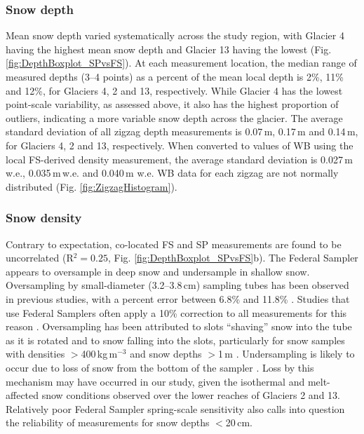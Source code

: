 \documentclass[review,oneside, letterpaper]{igs} %
\begin{document}
\subsubsection{Snow depth}
Mean snow depth varied systematically across the study region, with Glacier 4 having the highest mean snow depth and Glacier 13 having the lowest (Fig. \ref{fig:DepthBoxplot_SPvsFS}). At each measurement location, the median range of measured depths (3--4 points) as a percent of the mean local depth is 2\%, 11\% and 12\%, for Glaciers 4, 2 and 13, respectively. While Glacier 4 has the lowest point-scale variability, as assessed above, it also has the highest proportion of outliers, indicating a more variable snow depth across the glacier. The average standard deviation of all zigzag depth measurements is 0.07\,m, 0.17\,m and 0.14\,m, for Glaciers 4, 2 and 13, respectively. When converted to values of WB using the local FS-derived density measurement, the average standard deviation is 0.027\,m\,w.e., 0.035\,m\,w.e. and 0.040\,m w.e. WB data for each zigzag are not normally distributed (Fig. \ref{fig:ZigzagHistogram}).

\subsubsection{Snow density}

Contrary to expectation, co-located FS and SP measurements are found to be uncorrelated (R$^2=0.25$, Fig. \ref{fig:DepthBoxplot_SPvsFS}b). The Federal Sampler appears to oversample in deep snow and undersample in shallow snow. Oversampling by small-diameter (3.2--3.8\,cm) sampling tubes has been observed in previous studies, with a percent error between 6.8\% and 11.8\% \citep[e.g.][]{Work1965, Fames1982, Conger2009}. Studies that use Federal Samplers often apply a 10\% correction to all measurements for this reason \citep[e.g.][]{Molotch2005}. Oversampling has been attributed to slots ``shaving'' snow into the tube as it is rotated \citep[e.g.][]{Dixon2012} and to snow falling into the slots, particularly for snow samples with densities $>$400\,kg\,m$^{-3}$ and snow depths $>$1\,m \citep[e.g.][]{Beaumont1963}. Undersampling is likely to occur due to loss of snow from the bottom of the sampler \citep{Turcan1975}. Loss by this mechanism may have occurred in our study, given the isothermal and melt-affected snow conditions observed over the lower reaches of Glaciers 2 and 13. Relatively poor Federal Sampler spring-scale sensitivity also calls into question the reliability of measurements for snow depths $<$20\,cm.
\end{document}
